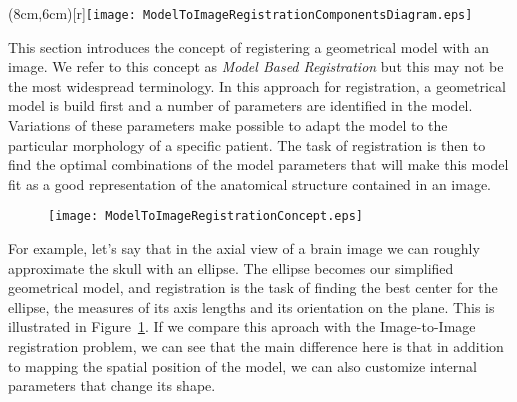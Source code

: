 %
%
%
%
%
%

\parpic(8cm,6cm)[r]{\texttt{[image: ModelToImageRegistrationComponentsDiagram.eps]}}

This section introduces the concept of registering a geometrical model with an
image. We refer to this concept as \emph{Model Based Registration} but this may
not be the most widespread terminology. In this approach for registration, a
geometrical model is build first and a number of parameters are identified in
the model. Variations of these parameters make possible to adapt the model to
the particular morphology of a specific patient. The task of registration is
then to find the optimal combinations of the model parameters that will make
this model fit as a good representation of the anatomical structure contained
in an image. 


\begin{figure}
\center
\texttt{[image: ModelToImageRegistrationConcept.eps]}
\label{fig:ModelToImageRegistrationConcept}
\end{figure}


For example, let's say that in the axial view of a brain image we can roughly
approximate the skull with an ellipse. The ellipse becomes our simplified
geometrical model, and registration is the task of finding the best center for
the ellipse, the measures of its axis lengths and its orientation on the plane.
This is illustrated in Figure~\ref{fig:ModelToImageRegistrationConcept}.  If we
compare this aproach with the Image-to-Image registration problem, we can see
that the main difference here is that in addition to mapping the spatial
position of the model, we can also customize internal parameters that change
its shape.

